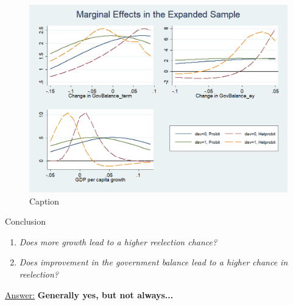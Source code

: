 \documentclass{beamer}
\begin{document}
\begin{frame}
    \begin{figure}
        \centering
        \includegraphics[width=1\textwidth]{AME_expanded.png}
        \caption{Caption}
        \label{fig:my_label}
    \end{figure}
\end{frame}
\begin{frame}{Conclusion}
\setlength\itemsep{2em}
\begin{enumerate}
\setlength\itemsep{2em}
    \item \textit{Does more growth lead to a higher reelection chance?} 
    \item \textit{Does improvement in the government balance lead to a higher chance in reelection?}\pause
\end{enumerate}
\item\underline{Answer:} \textbf{Generally yes, but not always...}
\end{frame}
\end{document}
